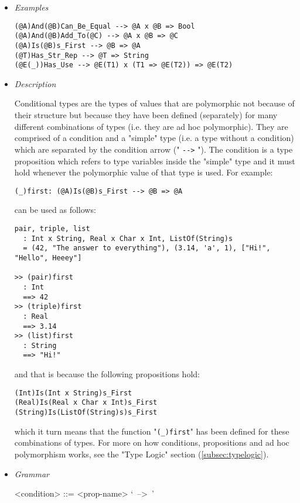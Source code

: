 \documentclass[diploma]{softlab-thesis}
\begin{document}
\begin{itemize}
\item \textit{Examples}
\begin{verbatim}
(@A)And(@B)Can_Be_Equal --> @A x @B => Bool
(@A)And(@B)Add_To(@C) --> @A x @B => @C
(@A)Is(@B)s_First --> @B => @A
(@T)Has_Str_Rep --> @T => String
(@E(_))Has_Use --> @E(T1) x (T1 => @E(T2)) => @E(T2)
\end{verbatim}

\item \textit{Description}

Conditional types are the types of values that are polymorphic not because of
their structure but because they have been defined (separately) for many
different combinations of types (i.e. they are ad hoc polymorphic). They are
comprised of a condition and a "simple" type (i.e. a type without a condition)
which are separated by the condition arrow (" \verb|-->| "). The condition is
a type proposition which refers to type variables inside the "simple" type and
it must hold whenever the polymorphic value of that type is used. For example:
\begin{verbatim}
(_)first: (@A)Is(@B)s_First --> @B => @A
\end{verbatim}
can be used as follows:
\begin{verbatim}
pair, triple, list
  : Int x String, Real x Char x Int, ListOf(String)s
  = (42, "The answer to everything"), (3.14, 'a', 1), ["Hi!", "Hello", Heeey"]

>> (pair)first
  : Int
  ==> 42
>> (triple)first
  : Real
  ==> 3.14
>> (list)first
  : String
  ==> "Hi!"
\end{verbatim}
and that is because the following propositions hold:
\begin{verbatim}
(Int)Is(Int x String)s_First
(Real)Is(Real x Char x Int)s_First
(String)Is(ListOf(String)s)s_First
\end{verbatim}
which it turn means that the function "\verb|(_)first|" has been defined for these
combinations of types. For more on how conditions, propositions and ad hoc
polymorphism works, see the "Type Logic" section (\ref{subsec:typelogic}).

\item \textit{Grammar}
\begin{grammar}
<condition> ::= <prop-name> `\ -->\ '
\end{grammar}

\end{itemize}

\newpage
\end{document}
